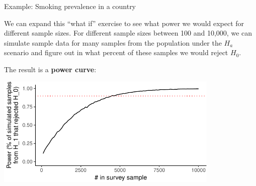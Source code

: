 \documentclass[ignorenonframetext,]{beamer}
\begin{document}
\begin{frame}{Example: Smoking prevalence in a country}

We can expand this ``what if'' exercise to see what power we would
expect for different sample sizes. For different sample sizes between
100 and 10,000, we can simulate sample data for many samples from the
population under the \(H_a\) scenario and figure out in what percent of
these samples we would reject \(H_0\).

The result is a \textbf{power curve}:

\begin{center}\includegraphics[width=0.8\textwidth]{sample_size_files/figure-beamer/unnamed-chunk-4-1} \end{center}

\end{frame}
\end{document}
